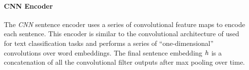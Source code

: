 
%  


\paragraph{CNN Encoder} The \textit{CNN} sentence encoder uses a series of 
convolutional feature maps to encode each sentence. This encoder is similar
to the convolutional architecture of \citet{kim2014convolutional} used for text
classification
tasks and performs a series of ``one-dimensional'' convolutions over 
word embeddings. The final sentence embedding $\sentEmb$ is a concatenation
of all the convolutional filter outputs after max pooling over time.


